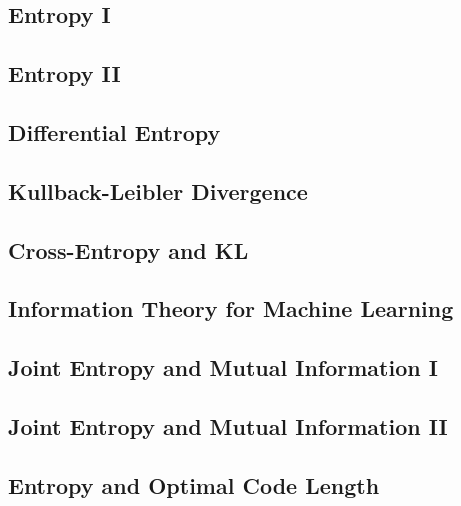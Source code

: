 
\subsection{Entropy I}


\subsection{Entropy II}


\subsection{Differential Entropy}


\subsection{Kullback-Leibler Divergence}


\subsection{Cross-Entropy and KL}


\subsection{Information Theory for Machine Learning}


\subsection{Joint Entropy and Mutual Information I}


\subsection{Joint Entropy and Mutual Information II}


\subsection{Entropy and Optimal Code Length}




